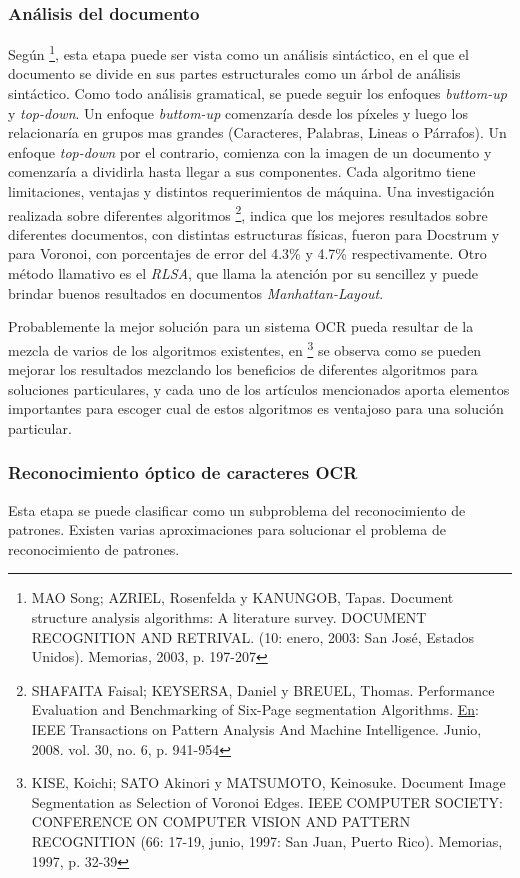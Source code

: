 \documentclass[a4paper, 11pt, oneside]{article}
\begin{document}
	\subsubsection{Análisis del documento}
	Según \footnote{MAO Song; AZRIEL, Rosenfelda y KANUNGOB, Tapas. Document structure analysis algorithms:
    A literature survey. DOCUMENT RECOGNITION AND RETRIVAL. (10: enero, 2003: San José, Estados Unidos). 
    Memorias, 2003, p. 197-207}, esta etapa puede ser vista como un análisis sintáctico,
	en el que el documento se divide en sus partes estructurales como un árbol de análisis
	sintáctico. Como todo análisis gramatical, se puede seguir los enfoques
	\textit{buttom-up} y \textit{top-down}. Un enfoque \textit{buttom-up} comenzaría desde
	los píxeles y luego los relacionaría en grupos mas grandes (Caracteres, Palabras, Lineas
	o Párrafos). Un enfoque \textit{top-down} por el contrario, comienza con la imagen de un
	documento y comenzaría a dividirla hasta llegar a sus componentes.
	Cada algoritmo tiene limitaciones, ventajas y distintos requerimientos de máquina.
	Una investigación realizada sobre diferentes algoritmos \footnote{SHAFAITA Faisal; KEYSERSA, 
    Daniel y BREUEL, Thomas. Performance Evaluation and Benchmarking of Six-Page segmentation Algorithms.
    \underline{En}: IEEE Transactions on Pattern Analysis And Machine Intelligence. 
    Junio, 2008. vol. 30, no. 6, p. 941-954}, indica que los mejores resultados sobre diferentes
    documentos, con distintas estructuras físicas, fueron para Docstrum y para Voronoi, con porcentajes
    de error del 4.3\% y 4.7\% respectivamente. Otro método	llamativo es el \textit{RLSA}, que llama 
    la atención por su sencillez y puede brindar buenos resultados en documentos \textit{Manhattan-Layout}.
	
	Probablemente la mejor solución para un sistema OCR pueda resultar de la mezcla de
	varios de los algoritmos existentes, en \footnote{KISE, Koichi; SATO Akinori y MATSUMOTO, 
    Keinosuke. Document Image Segmentation as Selection of Voronoi Edges. IEEE COMPUTER SOCIETY:
    CONFERENCE ON COMPUTER VISION AND PATTERN RECOGNITION (66: 17-19, junio, 1997: San Juan, 
    Puerto Rico). Memorias, 1997, p. 32-39} se observa como se pueden mejorar los resultados 
    mezclando los beneficios de diferentes algoritmos para soluciones particulares, y cada uno de
    los artículos mencionados aporta elementos importantes para escoger cual de estos algoritmos 
    es ventajoso para una solución particular.
	
	\subsubsection{Reconocimiento óptico de caracteres OCR}
	Esta etapa se puede clasificar como un subproblema del reconocimiento de patrones.
	Existen varias aproximaciones para solucionar el problema de reconocimiento de patrones.
     
\end{document}
